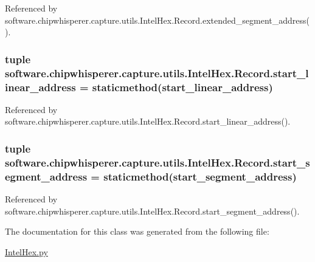 Referenced by software.\+chipwhisperer.\+capture.\+utils.\+Intel\+Hex.\+Record.\+extended\+\_\+segment\+\_\+address().

\hypertarget{classsoftware_1_1chipwhisperer_1_1capture_1_1utils_1_1IntelHex_1_1Record_ad8aa161e2b23c82719b0ba93fe28c045}{}
\subsubsection[{start\+\_\+linear\+\_\+address}]{\setlength{\rightskip}{0pt plus 5cm}tuple software.\+chipwhisperer.\+capture.\+utils.\+Intel\+Hex.\+Record.\+start\+\_\+linear\+\_\+address = staticmethod(start\+\_\+linear\+\_\+address)\hspace{0.3cm}{\ttfamily [static]}}\label{classsoftware_1_1chipwhisperer_1_1capture_1_1utils_1_1IntelHex_1_1Record_ad8aa161e2b23c82719b0ba93fe28c045}


Referenced by software.\+chipwhisperer.\+capture.\+utils.\+Intel\+Hex.\+Record.\+start\+\_\+linear\+\_\+address().

\hypertarget{classsoftware_1_1chipwhisperer_1_1capture_1_1utils_1_1IntelHex_1_1Record_aac32e40d4f3228b6b0889ad0f0fb1718}{}
\subsubsection[{start\+\_\+segment\+\_\+address}]{\setlength{\rightskip}{0pt plus 5cm}tuple software.\+chipwhisperer.\+capture.\+utils.\+Intel\+Hex.\+Record.\+start\+\_\+segment\+\_\+address = staticmethod(start\+\_\+segment\+\_\+address)\hspace{0.3cm}{\ttfamily [static]}}\label{classsoftware_1_1chipwhisperer_1_1capture_1_1utils_1_1IntelHex_1_1Record_aac32e40d4f3228b6b0889ad0f0fb1718}


Referenced by software.\+chipwhisperer.\+capture.\+utils.\+Intel\+Hex.\+Record.\+start\+\_\+segment\+\_\+address().



The documentation for this class was generated from the following file\+:\begin{DoxyCompactItemize}
\item 
\hyperlink{IntelHex_8py}{Intel\+Hex.\+py}\end{DoxyCompactItemize}
